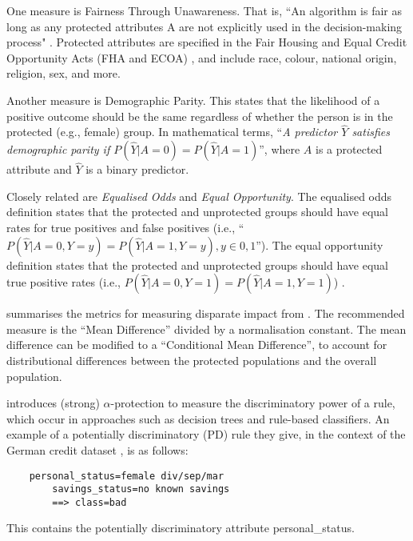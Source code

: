 \documentclass[conference]{IEEEtran}
\begin{document}
One measure is Fairness Through Unawareness. That is, ``An algorithm is fair as long as any protected attributes A are not explicitly used in the decision-making process" \cite{GrgicHlaca2016TheCF, NIPS2017_a486cd07}. Protected attributes are specified in the Fair Housing and Equal Credit Opportunity Acts (FHA and ECOA) \cite{Chen_2019}, and include race, colour, national origin, religion, sex, and more.

Another measure is Demographic Parity. This states that the likelihood of a positive outcome \cite{10.1145/3194770.3194776} should be the same regardless of whether the person is in the protected (e.g., female) group. In mathematical terms, ``\textit{A predictor $\hat{Y}$ satisfies demographic parity if $P(\hat{Y}|A=0) = P(\hat{Y}|A=1)$}'', where $A$ is a protected attribute and $\hat{Y}$ is a binary predictor.  

Closely related are \textit{Equalised Odds} and \textit{Equal Opportunity}. The equalised odds definition states that the protected and unprotected groups should have equal rates for true positives and false positives (i.e., ``$P(\hat{Y}|A=0, Y=y) = P(\hat{Y}|A=1, Y=y), y \in {0,1}$''). The equal opportunity definition states that the protected and unprotected groups should have equal true positive rates (i.e., $P(\hat{Y}|A=0, Y=1) = P(\hat{Y}|A=1, Y=1)$) \cite{DBLP:journals/corr/HardtPS16}.

\cite{d_Alessandro_2017} summarises the metrics for measuring disparate impact from \cite{DBLP:journals/corr/Zliobaite15a}. The recommended measure is the ``Mean Difference'' divided by a normalisation constant. The mean difference can be modified to a ``Conditional Mean Difference'', to account for distributional differences between the protected populations and the overall population.

\cite{10.1145/1401890.1401959} introduces (strong) $\alpha$-protection to measure the discriminatory power of a rule, which occur in approaches such as decision trees and rule-based classifiers. An example of a potentially discriminatory (PD) rule they give, in the context of the German credit dataset \cite{Dua:2019}, is as follows: 

\begin{lstlisting}
    personal_status=female div/sep/mar 
        savings_status=no known savings 
        ==> class=bad    
\end{lstlisting}

This contains the potentially discriminatory attribute personal\_status.
\end{document}
